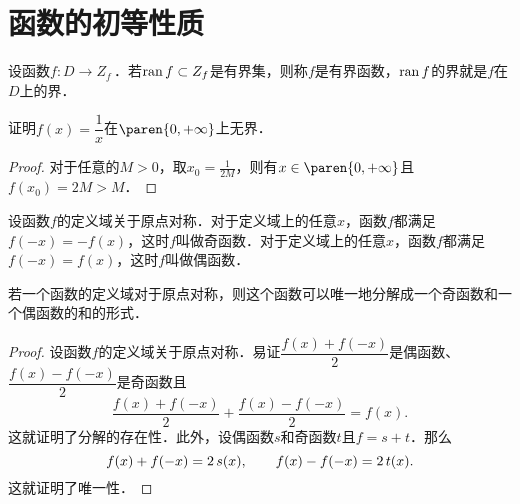 \section{函数的初等性质\label{sec:funcprops}}

\begin{definition*}
  设函数\(f\colon D \to Z_f\)\,．若\(\operatorname{ran} f \subset Z_f\)是有界集，则称\(f\)是有界函数，\(\operatorname{ran} f\)的界就是\(f\)在\(D\)上的界．
\end{definition*}

\begin{example*}
  证明\(f(x) = \dfrac1x\)在\(\paren{0,+\infty}\)上无界．

  \begin{proof}
    对于任意的\(M > 0\)，取\(x_0 = \frac1{2M}\)，则有\(x \in \paren{0,+\infty}\)且\(f(x_0) = 2M > M\)．
  \end{proof}
\end{example*}

\begin{definition*}
  设函数\(f\)的定义域关于原点对称．对于定义域上的任意\(x\)，函数\(f\)都满足\(f(-x) = -f(x)\)，这时\(f\)叫做奇函数．对于定义域上的任意\(x\)，函数\(f\)都满足\(f(-x) = f(x)\)，这时\(f\)叫做偶函数．
\end{definition*}

\hypertarget{T:evenodd}{}
\begin{theorem*}
  若一个函数的定义域对于原点对称，则这个函数可以唯一地分解成一个奇函数和一个偶函数的和的形式．

  \begin{proof}
    设函数\(f\)的定义域关于原点对称．易证\(\dfrac{f(x)+f(-x)}{2}\)是偶函数、\(\dfrac{f(x)-f(-x)}{2}\)是奇函数且
    \[
      \frac{f(x)+f(-x)}{2} + \frac{f(x)-f(-x)}{2} = f(x).
    \]
    这就证明了分解的存在性．此外，设偶函数\(s\)和奇函数\(t\)且\(f = s + t\)．那么
    \[
      f(x) + f(-x) = 2\mathop{\relax\kern0pt s}\nolimits(x),
      \qquad
      f(x) - f(-x) = 2\mathop{\relax\kern0pt t}\nolimits(x).
    \]
    这就证明了唯一性．
  \end{proof}
\end{theorem*}

